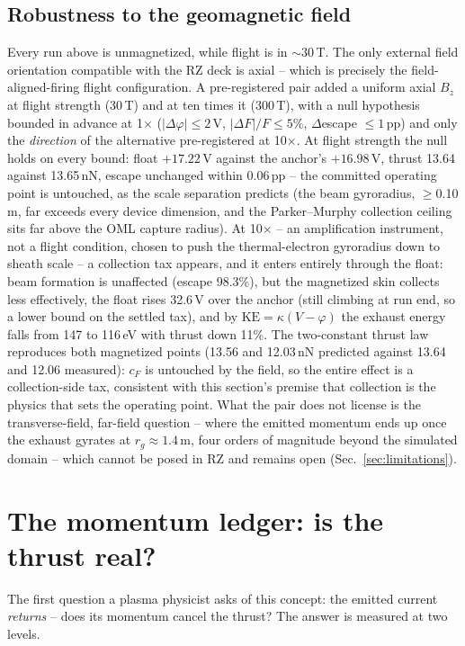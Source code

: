 \documentclass[11pt]{article}
\begin{document}
\subsection{Robustness to the geomagnetic field}
\label{sec:magnetized}
Every run above is unmagnetized, while flight is in $\sim$30\,\textmu T.
The only external field orientation compatible with the RZ deck is axial
-- which is precisely the field-aligned-firing flight configuration. A
pre-registered pair added a uniform axial $B_z$ at flight strength
(30\,\textmu T) and at ten times it (300\,\textmu T), with a null
hypothesis bounded in advance at 1$\times$ ($|\Delta\varphi| \le 2$\,V,
$|\Delta F|/F \le 5\%$, $\Delta$escape $\le 1$\,pp) and only the
\emph{direction} of the alternative pre-registered at 10$\times$. At
flight strength the null holds on every bound: float $+17.22$\,V against
the anchor's $+16.98$\,V, thrust 13.64 against 13.65\,nN, escape
unchanged within 0.06\,pp -- the committed operating point is untouched,
as the scale separation predicts (the beam gyroradius, $\ge$0.10\,m, far
exceeds every device dimension, and the Parker--Murphy collection
ceiling sits far above the OML capture radius). At 10$\times$ -- an
amplification instrument, not a flight condition, chosen to push the
thermal-electron gyroradius down to sheath scale -- a collection tax
appears, and it enters entirely through the float: beam formation is
unaffected (escape 98.3\%), but the magnetized skin collects less
effectively, the float rises 32.6\,V over the anchor (still climbing at
run end, so a lower bound on the settled tax), and by
$\mathrm{KE} = \kappa(V-\varphi)$ the exhaust energy falls from 147 to
116\,eV with thrust down 11\%. The two-constant thrust law reproduces
both magnetized points (13.56 and 12.03\,nN predicted against 13.64 and
12.06 measured): $c_F$ is untouched by the field, so the entire effect
is a collection-side tax, consistent with this section's premise that
collection is the physics that sets the operating point. What the pair
does not license is the transverse-field, far-field question -- where
the emitted momentum ends up once the exhaust gyrates at
$r_g \approx 1.4$\,m, four orders of magnitude beyond the simulated
domain -- which cannot be posed in RZ and remains open
(Sec.~\ref{sec:limitations}).

\section{The momentum ledger: is the thrust real?}
\label{sec:ledger}
The first question a plasma physicist asks of this concept: the emitted
current \emph{returns} -- does its momentum cancel the thrust? The answer is
measured at two levels.
\end{document}
